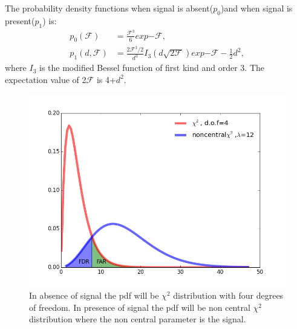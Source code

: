 \documentclass{ttuthes2007}
\begin{document}
The probability density functions when signal is absent($p_0$)and when signal is
present($p_1$) is:
\begin{equation}
\begin{split}
p_0(\mathcal{F})&=\frac{\mathcal{F}^3}{6}exp{-\mathcal{F}},\\
p_1(d,\mathcal{F})&=\frac{2\mathcal{F}^3/2}{d^3}I_3(d\sqrt{2\mathcal{F}})exp{-\mathcal{F}-\frac{1}{2}d^2},
\end{split}
\end{equation}
where $I_3$ is the modified Bessel function of first kind and order 3.
The expectation value of 2$\mathcal{F}$ is 4+$d^2$.
\begin{figure}[h!]
	\includegraphics[width=\textwidth]{figure/chi2.png}
	\caption{In absence of signal the pdf will be $\chi^2$ distribution with
four degrees of freedom. In presence of signal the pdf will be non central
$\chi^2$ distribution where the non central parameter is the signal.}
\end{figure}
\end{document}

